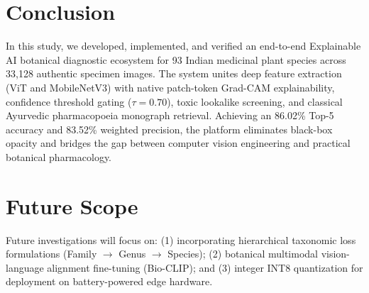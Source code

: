 \documentclass[sn-mathphys,Numbered]{sn-jnl}%
\begin{document}
\section{Conclusion}\label{sec9}
In this study, we developed, implemented, and verified an end-to-end Explainable AI botanical diagnostic ecosystem for 93 Indian medicinal plant species across 33,128 authentic specimen images. The system unites deep feature extraction (ViT and MobileNetV3) with native patch-token Grad-CAM explainability, confidence threshold gating ($\tau = 0.70$), toxic lookalike screening, and classical Ayurvedic pharmacopoeia monograph retrieval. Achieving an 86.02\% Top-5 accuracy and 83.52\% weighted precision, the platform eliminates black-box opacity and bridges the gap between computer vision engineering and practical botanical pharmacology.

\section{Future Scope}\label{sec10}
Future investigations will focus on: (1) incorporating hierarchical taxonomic loss formulations (Family $\to$ Genus $\to$ Species); (2) botanical multimodal vision-language alignment fine-tuning (Bio-CLIP); and (3) integer INT8 quantization for deployment on battery-powered edge hardware.
\end{document}
